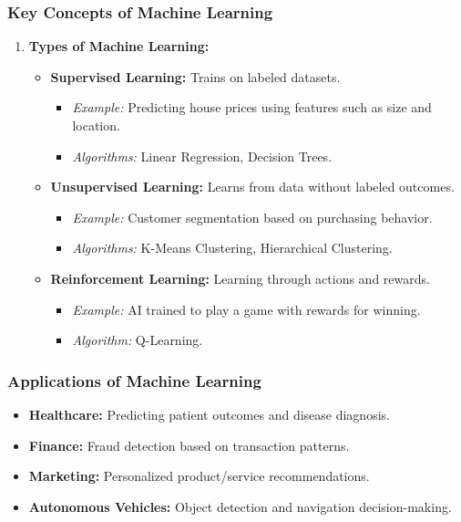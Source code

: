 \documentclass[aspectratio=169]{beamer}
\begin{document}
\begin{frame}[fragile]
    \frametitle{Key Concepts of Machine Learning}
    \begin{enumerate}
        \item \textbf{Types of Machine Learning:}
            \begin{itemize}
                \item \textbf{Supervised Learning:} Trains on labeled datasets.
                    \begin{itemize}
                        \item \textit{Example:} Predicting house prices using features such as size and location.
                        \item \textit{Algorithms:} Linear Regression, Decision Trees.
                    \end{itemize}
                    
                \item \textbf{Unsupervised Learning:} Learns from data without labeled outcomes.
                    \begin{itemize}
                        \item \textit{Example:} Customer segmentation based on purchasing behavior.
                        \item \textit{Algorithms:} K-Means Clustering, Hierarchical Clustering.
                    \end{itemize}
                    
                \item \textbf{Reinforcement Learning:} Learning through actions and rewards.
                    \begin{itemize}
                        \item \textit{Example:} AI trained to play a game with rewards for winning.
                        \item \textit{Algorithm:} Q-Learning.
                    \end{itemize}
            \end{itemize}
    \end{enumerate}
\end{frame}

\begin{frame}[fragile]
    \frametitle{Applications of Machine Learning}
    \begin{itemize}
        \item \textbf{Healthcare:} Predicting patient outcomes and disease diagnosis.
        \item \textbf{Finance:} Fraud detection based on transaction patterns.
        \item \textbf{Marketing:} Personalized product/service recommendations.
        \item \textbf{Autonomous Vehicles:} Object detection and navigation decision-making.
    \end{itemize}
\end{frame}
\end{document}
